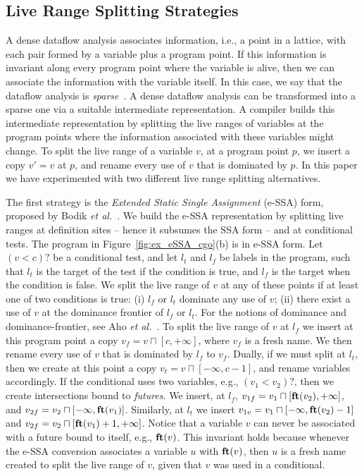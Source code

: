 \documentclass[preprint]{sigplanconf}[10pt]
\newcommand{\fun}[1]{\mbox{\textbf{#1}}}
\begin{document}
\subsection{Live Range Splitting Strategies}
\label{sub:splitting}

A dense dataflow analysis associates information, i.e., a point in a lattice,
with each pair formed by a variable plus a program point.
If this information is invariant along every program point where the variable
is alive, then we can associate the information with the variable itself.
In this case, we say that the dataflow analysis is {\em sparse}~\cite{Choi91}.
A dense dataflow analysis can be transformed into a sparse one via a suitable
intermediate representation.
A compiler builds this intermediate representation by splitting the live ranges
of variables at the program points where the information associated with these
variables might change.
To split the live range of a variable $v$, at a program point $p$, we insert
a copy $v' = v$ at $p$, and rename every use of $v$ that is dominated by $p$.
In this paper we have experimented with two different live range splitting
alternatives.

The first strategy is the {\em Extended Static Single Assignment} (e-SSA) form,
proposed by Bodik {\em et al.}~\cite{Bodik00}.
We build the e-SSA representation by splitting live ranges at definition sites
-- hence it subsumes the SSA form -- and at conditional tests.
The program in Figure~\ref{fig:ex_eSSA_cgo}(b) is in e-SSA form.
Let $(v < c)?$ be a conditional test, and let $l_t$ and $l_f$ be labels in
the program, such that $l_t$ is the target of the test if the condition is true,
and $l_f$ is the target when the condition is false.
We split the live range of $v$ at any of these points if at least one of two
conditions is true:
(i) $l_f$ or $l_t$ dominate any use of $v$;
(ii) there exist a use of $v$ at the dominance frontier of $l_f$ or $l_t$.
For the notions of dominance and dominance-frontier, see Aho
{\em et al.}~\cite[p.656]{Aho06}.
To split the live range of $v$ at $l_f$ we insert at this
program point a copy $v_f = v \sqcap [c, +\infty]$, where $v_f$ is a fresh name.
We then rename every use of $v$ that is dominated by $l_f$ to $v_f$.
Dually, if we must split at $l_t$, then we create at this point a copy
$v_t = v \sqcap [-\infty, c-1]$, and rename variables accordingly.
If the conditional uses two variables, e.g., $(v_1 < v_2)?$, then we create
intersections bound to {\em futures}.
We insert, at $l_f$, $v_{1f} = v_1 \sqcap [\fun{ft}(v_2), +\infty]$,
and $v_{2f} = v_2 \sqcap [-\infty, \fun{ft}(v_1)]$.
Similarly, at $l_t$ we insert
$v_{1v} = v_1 \sqcap [-\infty, \fun{ft}(v_2) - 1]$
and $v_{2f} = v_2 \sqcap [\fun{ft}(v_1) + 1, +\infty]$.
Notice that a variable $v$ can never be associated with a future bound to
itself, e.g., $\fun{ft}(v)$.
This invariant holds because whenever the e-SSA conversion associates a variable
$u$ with $\fun{ft}(v)$, then $u$ is a fresh name created to split the live range
of $v$, given that $v$ was used in a conditional.
\end{document}
